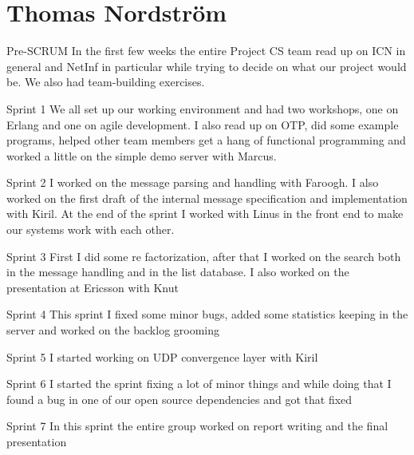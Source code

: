 \section{Thomas Nordstr\"om}

Pre-SCRUM
In the first few weeks the entire Project CS team read up on ICN in general and NetInf in particular while trying to decide on what our project would be. We also had team-building exercises.

Sprint 1
We all set up our working environment and had two workshops, one on Erlang and one on agile development. I also read up on OTP, did some example programs, helped other team members get a hang of functional programming and worked a little on the simple demo server with Marcus.

Sprint 2
I worked on the message parsing and handling with Faroogh. I also worked on the first draft of the internal message specification and implementation with Kiril. At the end of the sprint I worked with Linus in the front end to make our systems work with each other.

Sprint 3
First I did some re factorization, after that I worked on the search both in the message handling and in the list database. I also worked on the presentation at Ericsson with Knut

Sprint 4
This sprint I fixed some minor bugs, added some statistics keeping in the server and worked on the backlog grooming

Sprint 5
I started working on UDP convergence layer with Kiril

Sprint 6
I started the sprint fixing a lot of minor things and while doing that I found a bug in one of our open source  dependencies and got that fixed

Sprint 7
In this sprint the entire group worked on report writing and the final presentation